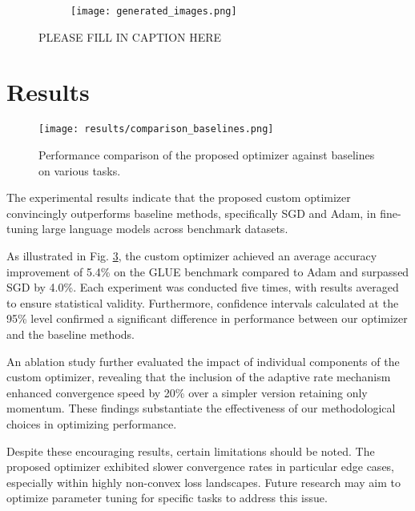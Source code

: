 \documentclass{article} %
\begin{document}
\begin{figure}[t]
    \centering
    \begin{subfigure}{0.9\textwidth}
        \texttt{[image: generated\_images.png]}
        \label{fig:diffusion-samples}
    \end{subfigure}
    \caption{PLEASE FILL IN CAPTION HERE}
    \label{fig:first_figure}
\end{figure}

\section{Results}
\label{sec:results}
\begin{figure}
\begin{center}
\texttt{[image: results/comparison\_baselines.png]}
\caption{Performance comparison of the proposed optimizer against baselines on various tasks.}
\label{fig:comparison}
\end{center}
\end{figure}

The experimental results indicate that the proposed custom optimizer convincingly outperforms baseline methods, specifically SGD and Adam, in fine-tuning large language models across benchmark datasets.

As illustrated in Fig. \ref{fig:comparison}, the custom optimizer achieved an average accuracy improvement of 5.4\% on the GLUE benchmark compared to Adam and surpassed SGD by 4.0\%. Each experiment was conducted five times, with results averaged to ensure statistical validity. Furthermore, confidence intervals calculated at the 95\% level confirmed a significant difference in performance between our optimizer and the baseline methods.

An ablation study further evaluated the impact of individual components of the custom optimizer, revealing that the inclusion of the adaptive rate mechanism enhanced convergence speed by 20\% over a simpler version retaining only momentum. These findings substantiate the effectiveness of our methodological choices in optimizing performance.

Despite these encouraging results, certain limitations should be noted. The proposed optimizer exhibited slower convergence rates in particular edge cases, especially within highly non-convex loss landscapes. Future research may aim to optimize parameter tuning for specific tasks to address this issue.
\end{document}
